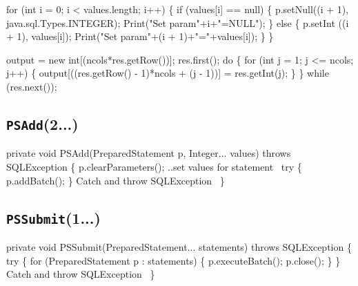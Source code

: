 \documentclass{article}
\def\nwendcode{\endtrivlist \endgroup}      %
\let\nwdocspar=\par
\theoremstyle{definition}                   %
\begin{document}
for (int i = 0; i < values.length; i++) \{
  if (values[i] == null) \{
    p.setNull((i + 1), java.sql.Types.INTEGER);
    Print("Set param"+i+"=NULL");
  \} else \{
    p.setInt ((i + 1), values[i]);
    Print("Set param"+(i + 1)+"="+values[i]);
  \}
\}
\nwendcode{}\nwdocspar
\nwenddocs{}\endmoddef{}
output = new int[(ncols*res.getRow())];
res.first();
do \{
  for (int j = 1; j <= ncols; j++) \{
    output[((res.getRow() - 1)*ncols + (j - 1))] = res.getInt(j);
  \}
\} while (res.next());
\nwendcode{}\nwdocspar

\subsection{{\tt{}\protect{}PSAdd}(2...)}
\nwenddocs{}\endmoddef{}
private void PSAdd(PreparedStatement p, Integer... values) throws SQLException \{
  p.clearParameters();
  \LA{}..set values for statement~{\nwtagstyle{}}\RA{}
  try \{
    p.addBatch();
  \}
  \LA{}Catch and throw \code{}SQLException\edoc{}~{\nwtagstyle{}}\RA{}
\}
\eatline
{}\nwendcode{}\nwdocspar
\subsection{{\tt{}\protect{}PSSubmit}(1...)}
\nwenddocs{}\endmoddef{}
private void PSSubmit(PreparedStatement... statements) throws SQLException \{
  try \{
    for (PreparedStatement p : statements) \{
      p.executeBatch();
      p.close();
    \}
  \}
  \LA{}Catch and throw \code{}SQLException\edoc{}~{\nwtagstyle{}}\RA{}
\}
\eatline
{}\nwendcode{}\nwdocspar
\end{document}
